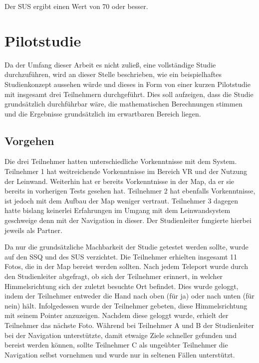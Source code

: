 \begin{hypothesis}
\label{hyp:test}
Der SUS ergibt einen Wert von 70 oder besser.
\end{hypothesis}


\section{Pilotstudie}

Da der Umfang dieser Arbeit es nicht zuließ, eine vollständige Studie durchzuführen, wird an dieser Stelle beschrieben, wie ein beispielhaftes Studienkonzept aussehen würde und dieses in Form von einer kurzen Pilotstudie mit insgesamt drei Teilnehmern durchgeführt. Dies soll aufzeigen, dass die Studie grundsätzlich durchführbar wäre, die mathematischen Berechnungen stimmen und die Ergebnisse grundsätzlich im erwartbaren Bereich liegen.

\subsection{Vorgehen}
Die drei Teilnehmer hatten unterschiedliche Vorkenntnisse mit dem System. Teilnehmer 1 hat weitreichende Vorkenntnisse im Bereich VR und der Nutzung der Leinwand. Weiterhin hat er bereits Vorkenntnisse in der Map, da er sie bereits in vorherigen Tests gesehen hat. Teilnehmer 2 hat ebenfalls Vorkenntnisse, ist jedoch mit dem Aufbau der Map weniger vertraut. Teilnehmer 3 dagegen hatte bislang keinerlei Erfahrungen im Umgang mit dem Leinwandsystem geschweige denn mit der Navigation in dieser. Der Studienleiter fungierte hierbei jeweils als Partner.

Da nur die grundsätzliche Machbarkeit der Studie getestet werden sollte, wurde auf den SSQ und des SUS verzichtet. Die Teilnehmer erhielten insgesamt 11 Fotos, die in der Map bereist werden sollten. Nach jedem Teleport wurde durch den Studienleiter abgefragt, ob sich der Teilnehmer erinnert, in welcher Himmelsrichtung sich der zuletzt besuchte Ort befindet. Dies wurde geloggt, indem der Teilnehmer entweder die Hand nach oben (für ja) oder nach unten (für nein) hält.
Infolgedessen wurde der Teilnehmer gebeten, diese Himmelsrichtung mit seinem Pointer anzuzeigen. Nachdem diese geloggt wurde, erhielt der Teilnehmer das nächste Foto. Während bei Teilnehmer A und B der Studienleiter bei der Navigation unterstützte, damit etwaige Ziele schneller gefunden und bereist werden können, sollte Teilnehmer C als ungeübter Teilnehmer die Navigation selbst vornehmen und wurde nur in seltenen Fällen unterstützt.

